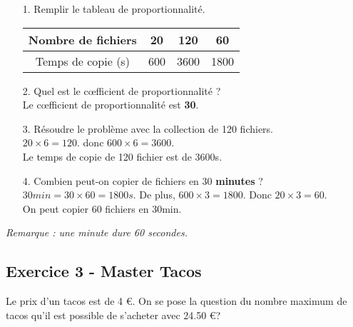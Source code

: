 \documentclass[12pt]{article}
\begin{document}
\begin{enumerate}
\item[1.] Remplir le tableau de proportionnalité.

  \begin{center}
    \begin{tabular}{| c || c | c | c |}
      \hline
      Nombre de fichiers & 20  &  120 & 60  \\
      \hline
      Temps de copie (s) & 600 & 3600 & 1800\\ 
      \hline
    \end{tabular}
  \end{center}

\item[2.] Quel est le cœfficient de proportionnalité ?\\
Le cœfficient de proportionnalité est \textbf{30}.

\item[3.] Résoudre le problème avec la collection de 120 fichiers. \\
 $20 \times 6 = 120$. donc $600 \times 6 = 3600$.\\
Le temps de copie de 120 fichier est de 3600s.

\item[4.] Combien peut-on copier de fichiers en 30 \textbf{minutes} ? \\
  $30min = 30 \times 60 = 1800s$. De plus, $600 \times 3 = 1800$. Donc $20 \times 3 = 60$.\\
On peut copier 60 fichiers en 30min.

\end{enumerate}
\textit{Remarque : une minute dure 60 secondes.}

\subsection*{Exercice 3 - Master Tacos}

Le prix d'un tacos est de 4 \euro{}. On se pose la question du nombre maximum de tacos qu'il est possible de s'acheter avec 24.50 \euro{}?
\end{document}
